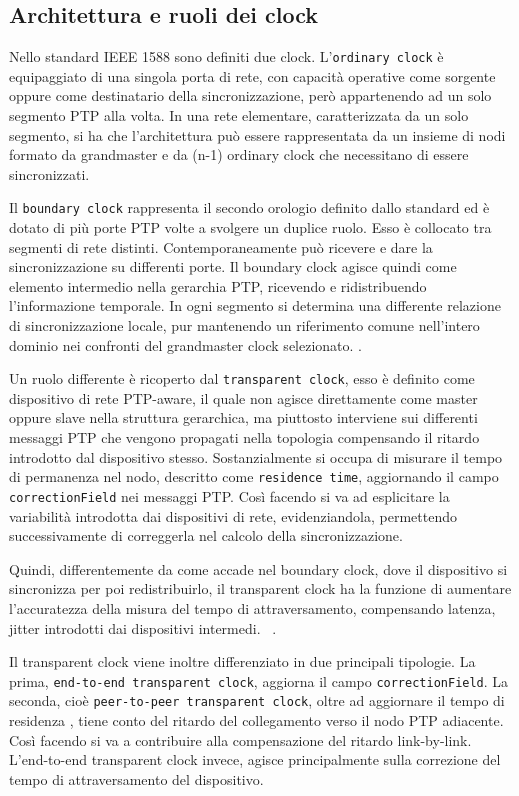 \subsection{Architettura e ruoli dei clock}

Nello standard IEEE 1588 sono definiti due clock. L'\texttt{ordinary clock} 
è equipaggiato di una singola porta di rete, con capacità operative come sorgente oppure come 
destinatario della sincronizzazione, però appartenendo ad un solo segmento PTP alla volta. 
In una rete elementare, caratterizzata da un solo segmento, si ha che l'architettura 
può essere rappresentata da un insieme di nodi formato da grandmaster e da (n-1) ordinary 
clock che necessitano di essere sincronizzati.


Il \texttt{boundary clock} rappresenta il secondo orologio definito dallo standard ed è dotato 
di più porte PTP volte a svolgere un duplice ruolo. Esso è collocato tra segmenti di rete distinti.
 Contemporaneamente può ricevere e dare la sincronizzazione su differenti porte.
 Il boundary clock agisce quindi come elemento intermedio nella gerarchia PTP, ricevendo e ridistribuendo
 l'informazione temporale. In ogni segmento si determina una differente relazione di sincronizzazione locale, pur mantenendo
 un riferimento comune nell'intero dominio nei confronti del grandmaster clock selezionato. \cite{IEEEStandardPrecision2020}.

Un ruolo differente è ricoperto dal \texttt{transparent clock}, esso è definito come dispositivo 
di rete PTP-aware, il quale non agisce direttamente come master oppure slave nella struttura gerarchica, ma piuttosto interviene
 sui differenti messaggi PTP che vengono propagati nella topologia compensando il ritardo introdotto dal dispositivo stesso.
Sostanzialmente si occupa di misurare il tempo di permanenza nel nodo, descritto come \texttt{residence time}, aggiornando il 
campo \texttt{correctionField} nei messaggi PTP.
Così facendo si va ad esplicitare la variabilità introdotta dai dispositivi di rete, evidenziandola, permettendo successivamente 
di correggerla nel calcolo della sincronizzazione.

Quindi, differentemente da come accade nel boundary clock, dove il dispositivo si sincronizza per poi redistribuirlo, 
il transparent clock ha la funzione di aumentare l'accuratezza della misura del tempo di attraversamento, compensando latenza, 
jitter introdotti dai dispositivi intermedi. ~\cite{PTP_net}.

Il transparent clock viene inoltre differenziato in due principali tipologie. 
La prima, \texttt{end-to-end transparent clock}, aggiorna il campo \texttt{correctionField}. La seconda, cioè \texttt{peer-to-peer transparent clock},
 oltre ad aggiornare il tempo di residenza , tiene conto del ritardo del collegamento verso il nodo PTP adiacente. Così
 facendo si va a contribuire alla compensazione del ritardo link-by-link. L'end-to-end transparent clock invece, 
 agisce principalmente sulla correzione del tempo di attraversamento del dispositivo.


